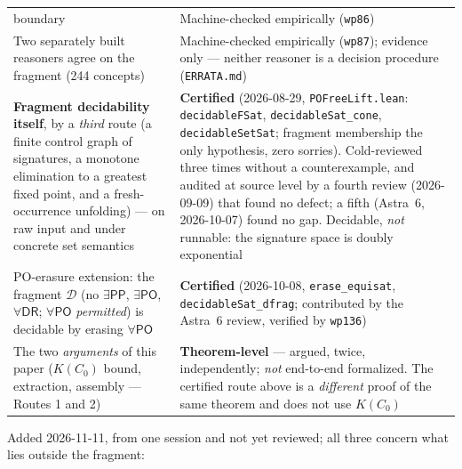 \documentclass[11pt]{article}
\newcommand{\DR}{\ensuremath{\mathsf{DR}}}
\newcommand{\PO}{\ensuremath{\mathsf{PO}}}
\newcommand{\PP}{\ensuremath{\mathsf{PP}}}
\newcommand{\code}[1]{\texttt{#1}}
\begin{document}
\begin{center}
\begin{tabular}{@{}>{\raggedright\arraybackslash}p{}>{\raggedright\arraybackslash}p{}@{}}
boundary & Machine-checked empirically (\code{wp86})\\[0.3em]
Two separately built reasoners agree on the fragment (244 concepts) &
Machine-checked empirically (\code{wp87}); evidence only --- neither
reasoner is a decision procedure (\code{ERRATA.md})\\[0.3em]
\textbf{Fragment decidability itself}, by a \emph{third} route (a finite
control graph of signatures, a monotone elimination to a greatest fixed
point, and a fresh-occurrence unfolding) --- on raw input and under
concrete set semantics & \textbf{Certified} (2026-08-29,
\code{POFreeLift.lean}: \code{decidableFSat}, \code{decidableSat\_cone},
\code{decidableSetSat}; fragment membership the only hypothesis, zero
sorries). Cold-reviewed three times without a counterexample, and audited
at source level by a fourth review (2026-09-09) that found no defect; a
fifth (Astra~6, 2026-10-07) found no gap.
Decidable, \emph{not} runnable: the signature space is doubly
exponential\\[0.3em]
PO-erasure extension: the fragment $\mathcal D$ (no $\exists\PP$,
$\exists\PO$, $\forall\DR$; $\forall\PO$ \emph{permitted}) is decidable by
erasing $\forall\PO$ & \textbf{Certified} (2026-10-08,
\code{erase\_equisat}, \code{decidableSat\_dfrag}; contributed by the
Astra~6 review, verified by \code{wp136})\\[0.3em]
The two \emph{arguments} of this paper ($K(C_0)$ bound, extraction,
assembly --- Routes 1 and 2) & \textbf{Theorem-level} --- argued, twice,
independently; \emph{not} end-to-end formalized. The certified route above
is a \emph{different} proof of the same theorem and does not use
$K(C_0)$\\
\bottomrule
\end{tabular}
\end{center}

\noindent Added 2026-11-11, from one session and not yet reviewed; all three
concern what lies outside the fragment:
\end{document}
